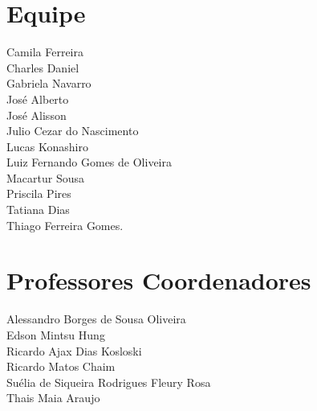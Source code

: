 \begin{center}

\chapter*{Equipe}

Camila Ferreira \\
Charles Daniel \\
Gabriela Navarro \\
José Alberto \\
José Alisson \\
Julio Cezar do Nascimento \\
Lucas Konashiro \\
Luiz Fernando Gomes de Oliveira \\
Macartur Sousa \\
Priscila Pires \\
Tatiana Dias \\
Thiago Ferreira Gomes.

\vspace{3cm}

\let\clearpage\relax
\chapter*{Professores Coordenadores}

Alessandro Borges de Sousa Oliveira \\
Edson Mintsu Hung \\
Ricardo Ajax Dias Kosloski \\
Ricardo Matos Chaim  \\
Suélia de Siqueira Rodrigues Fleury Rosa \\
Thais Maia Araujo \\

\end{center}

\newpage
